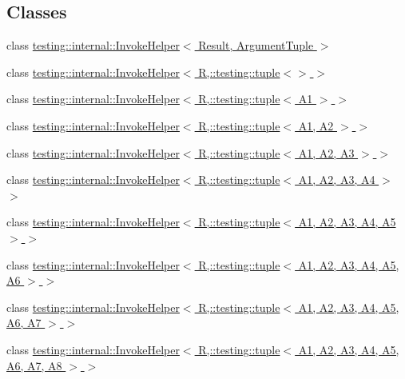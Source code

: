 \subsection*{Classes}
\begin{DoxyCompactItemize}
\item 
class \hyperlink{classtesting_1_1internal_1_1InvokeHelper}{testing\+::internal\+::\+Invoke\+Helper$<$ Result, Argument\+Tuple $>$}
\item 
class \hyperlink{classtesting_1_1internal_1_1InvokeHelper_3_01R_00_1_1testing_1_1tuple_3_4_01_4}{testing\+::internal\+::\+Invoke\+Helper$<$ R,\+::testing\+::tuple$<$$>$ $>$}
\item 
class \hyperlink{classtesting_1_1internal_1_1InvokeHelper_3_01R_00_1_1testing_1_1tuple_3_01A1_01_4_01_4}{testing\+::internal\+::\+Invoke\+Helper$<$ R,\+::testing\+::tuple$<$ A1 $>$ $>$}
\item 
class \hyperlink{classtesting_1_1internal_1_1InvokeHelper_3_01R_00_1_1testing_1_1tuple_3_01A1_00_01A2_01_4_01_4}{testing\+::internal\+::\+Invoke\+Helper$<$ R,\+::testing\+::tuple$<$ A1, A2 $>$ $>$}
\item 
class \hyperlink{classtesting_1_1internal_1_1InvokeHelper_3_01R_00_1_1testing_1_1tuple_3_01A1_00_01A2_00_01A3_01_4_01_4}{testing\+::internal\+::\+Invoke\+Helper$<$ R,\+::testing\+::tuple$<$ A1, A2, A3 $>$ $>$}
\item 
class \hyperlink{classtesting_1_1internal_1_1InvokeHelper_3_01R_00_1_1testing_1_1tuple_3_01A1_00_01A2_00_01A3_00_01A4_01_4_01_4}{testing\+::internal\+::\+Invoke\+Helper$<$ R,\+::testing\+::tuple$<$ A1, A2, A3, A4 $>$ $>$}
\item 
class \hyperlink{classtesting_1_1internal_1_1InvokeHelper_3_01R_00_1_1testing_1_1tuple_3_01A1_00_01A2_00_01A3_00_01A4_00_01A5_01_4_01_4}{testing\+::internal\+::\+Invoke\+Helper$<$ R,\+::testing\+::tuple$<$ A1, A2, A3, A4, A5 $>$ $>$}
\item 
class \hyperlink{classtesting_1_1internal_1_1InvokeHelper_3_01R_00_1_1testing_1_1tuple_3_01A1_00_01A2_00_01A3_00_01A4_00_01A5_00_01A6_01_4_01_4}{testing\+::internal\+::\+Invoke\+Helper$<$ R,\+::testing\+::tuple$<$ A1, A2, A3, A4, A5, A6 $>$ $>$}
\item 
class \hyperlink{classtesting_1_1internal_1_1InvokeHelper_3_01R_00_1_1testing_1_1tuple_3_01A1_00_01A2_00_01A3_00_b7816aa3474ddb9fa0fd012d718c7441}{testing\+::internal\+::\+Invoke\+Helper$<$ R,\+::testing\+::tuple$<$ A1, A2, A3, A4, A5, A6, A7 $>$ $>$}
\item 
class \hyperlink{classtesting_1_1internal_1_1InvokeHelper_3_01R_00_1_1testing_1_1tuple_3_01A1_00_01A2_00_01A3_00_c3256b948e767f440ca72203dbf5e97c}{testing\+::internal\+::\+Invoke\+Helper$<$ R,\+::testing\+::tuple$<$ A1, A2, A3, A4, A5, A6, A7, A8 $>$ $>$}

\end{DoxyCompactItemize}
